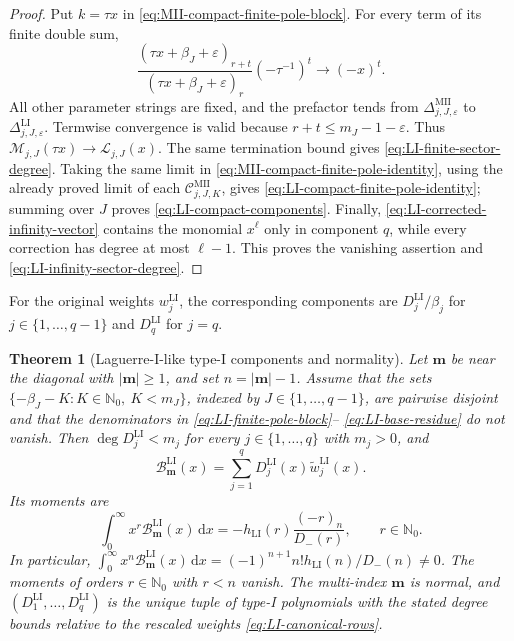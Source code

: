 \documentclass[10pt]{amsart}
\newcommand{\Nzero}{\mathbb N_0}
\newcommand{\dd}{\,\mathrm d}
\newcommand{\mm}{\boldsymbol m}
\newcommand{\abs}[1]{\lvert#1\rvert}
\theoremstyle{plain}
\newtheorem{theorem}{Theorem}[section]
\theoremstyle{definition}
\theoremstyle{remark}
\begin{document}
\begin{proof}
Put \(k=\tau x\) in
\eqref{eq:MII-compact-finite-pole-block}. For every term of its finite
double sum,
\[
 \frac{(\tau x+\beta_J+\varepsilon)_{r+t}}
 {(\tau x+\beta_J+\varepsilon)_r}
 (-\tau^{-1})^t\longrightarrow(-x)^t.
\]
All other parameter strings are fixed, and the prefactor tends from
\(\Delta_{j,J,\varepsilon}^{\mathrm{MII}}\) to
\(\Delta_{j,J,\varepsilon}^{\mathrm{LI}}\). Termwise convergence is
valid because \(r+t\le m_J-1-\varepsilon\). Thus
\(\mathscr M_{j,J}(\tau x)\to\mathscr L_{j,J}(x)\).
The same termination bound gives
\eqref{eq:LI-finite-sector-degree}.
Taking the same limit in
\eqref{eq:MII-compact-finite-pole-identity}, using the already proved
limit of each \(\mathcal C_{j,J,K}^{\mathrm{MII}}\), gives
\eqref{eq:LI-compact-finite-pole-identity}; summing over \(J\) proves
\eqref{eq:LI-compact-components}. Finally,
\eqref{eq:LI-corrected-infinity-vector} contains the monomial \(x^\ell\)
only in component \(q\), while every correction has degree at most
\(\ell-1\). This proves the vanishing assertion and
\eqref{eq:LI-infinity-sector-degree}.
\end{proof}

For the original weights \(w_j^{\mathrm{LI}}\), the corresponding
components are \(D_j^{\mathrm{LI}}/\beta_j\) for
\(j\in\{1,\ldots,q-1\}\) and
\(D_q^{\mathrm{LI}}\) for \(j=q\).

\begin{theorem}[Laguerre-I-like type-I components and normality]
\label{thm:explicit-LI-B}
Let \(\mm\) be near the diagonal with \(\abs\mm\ge1\), and set
\(n=\abs\mm-1\). Assume that the sets
\(\{-\beta_J-K:K\in\Nzero,\ K<m_J\}\), indexed by
\(J\in\{1,\ldots,q-1\}\), are pairwise disjoint and that
the denominators in \eqref{eq:LI-finite-pole-block}--
\eqref{eq:LI-base-residue} do not vanish. Then
\(\deg D_j^{\mathrm{LI}}<m_j\) for every
\(j\in\{1,\ldots,q\}\) with \(m_j>0\), and
\begin{equation}
 \mathcal B_{\mm}^{\mathrm{LI}}(x)
 =\sum_{j=1}^qD_j^{\mathrm{LI}}(x)
   \widetilde w_j^{\mathrm{LI}}(x).
 \label{eq:LI-component-decomposition}
\end{equation}
Its moments are
\begin{equation}
 \int_0^\infty x^r\mathcal B_{\mm}^{\mathrm{LI}}(x)\dd x
 =-h_{\mathrm{LI}}(r)\frac{(-r)_n}{D_-(r)},
 \qquad r\in\Nzero.
 \label{eq:LI-complete-moments}
\end{equation}
In particular,
\(\int_0^\infty x^n\mathcal B_{\mm}^{\mathrm{LI}}(x)\dd x
=(-1)^{n+1}n!h_{\mathrm{LI}}(n)/D_-(n)\ne0\).
The moments of orders \(r\in\Nzero\) with \(r<n\) vanish. The multi-index
\(\mm\) is normal, and
\((D_1^{\mathrm{LI}},\ldots,D_q^{\mathrm{LI}})\) is the unique tuple of
type-I polynomials with the stated degree bounds relative to the rescaled weights
\eqref{eq:LI-canonical-rows}.
\end{theorem}
\end{document}
